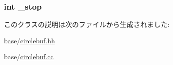 \label{classCircleBuf_aea5c93b4bb6fe666b13e46b84db33233}
\hypertarget{classCircleBuf_afe79e6847d4f6bee712af4da0425e962}{
\subsubsection[{\_\-stop}]{\setlength{\rightskip}{0pt plus 5cm}int {\bf \_\-stop}}}
\label{classCircleBuf_afe79e6847d4f6bee712af4da0425e962}


このクラスの説明は次のファイルから生成されました:\begin{DoxyCompactItemize}
\item 
base/\hyperlink{circlebuf_8hh}{circlebuf.hh}\item 
base/\hyperlink{circlebuf_8cc}{circlebuf.cc}\end{DoxyCompactItemize}
